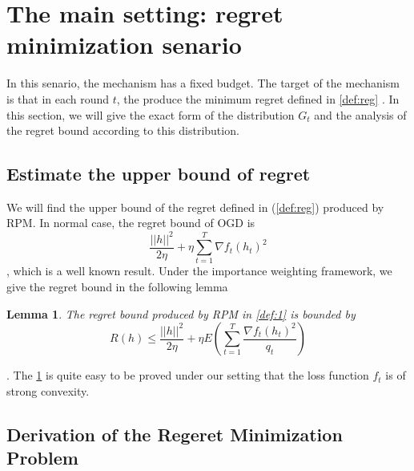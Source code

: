 \documentclass[10pt,conference,compsocconf,letterpaper]{IEEEtran}
\newtheorem{Lemma}{Lemma}
\begin{document}
\section{The main setting: regret minimization senario}\label{mainsolution}
In this senario, the mechanism has a fixed budget. The target of the mechanism is that in each round $t$, the  produce the minimum regret defined in \ref{def:reg} . In this section, we will give the exact form of the distribution $G_t$ and the analysis of the regret bound according to this distribution. 
\subsection{Estimate the upper bound of regret}
We will find the upper bound of the regret defined in (\ref{def:reg}) produced by RPM. In normal case, the regret bound of OGD is 
\begin{equation}
\frac{||h||^2}{2\eta}+\eta \sum_{t=1}^T\nabla f_t(h_t)^2
\end{equation}
, which is a well known result. Under the importance weighting framework, we give the regret bound in the following lemma
\begin{Lemma}\label{lemma:reg}
The regret bound produced by RPM in \ref{def:1} is bounded by
\begin{equation}
R(h)\leq \frac{||h||^2}{2\eta}+\eta E(\sum_{t=1}^T\frac{\nabla f_t(h_t)^2}{q_t})
\end{equation}
\end{Lemma}
. The \ref{lemma:reg} is quite easy to be proved under our setting that the loss function $f_t$ is of strong convexity.

\subsection{Derivation of the Regeret Minimization Problem}
\end{document}
